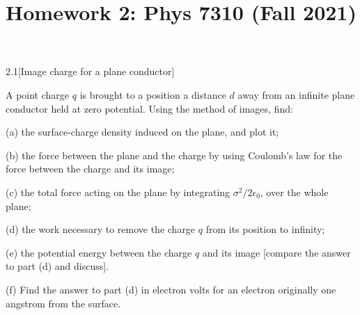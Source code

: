 \documentclass[12pt]{article}
\title{Homework 2: Phys 7310 (Fall 2021)}
\begin{document}
\maketitle

\begin{problem}{2.1}[Image charge for a plane conductor]

A point charge $q$ is brought to a position a distance $d$ away from an infinite
plane conductor held at zero potential. Using the method of images, find:

(a) the surface-charge density induced on the plane, and plot it;

(b) the force between the plane and the charge by using Coulomb's law for the
force between the charge and its image;

(c) the total force acting on the plane by integrating $\sigma^2/2\epsilon_0$,
over the whole plane;

(d) the work necessary to remove the charge $q$ from its position to infinity;

(e) the potential energy between the charge $q$ and its image [compare the
answer to part (d) and discuss].

(f) Find the answer to part (d) in electron volts for an electron originally one
angstrom from the surface.

\begin{solution}


\end{solution}
\end{problem}
\end{document}
